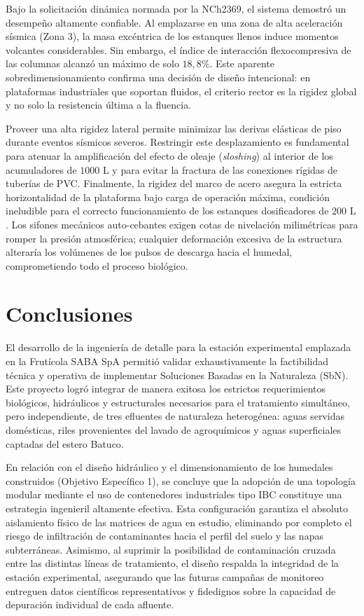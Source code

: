 \documentclass[12pt, letterpaper]{report}
\begin{document}
Bajo la solicitación dinámica normada por la NCh2369, el sistema demostró un desempeño altamente confiable. Al emplazarse en una zona de alta aceleración sísmica (Zona 3), la masa excéntrica de los estanques llenos induce momentos volcantes considerables. Sin embargo, el índice de interacción flexocompresiva de las columnas alcanzó un máximo de solo $18,8\%$. Este aparente sobredimensionamiento confirma una decisión de diseño intencional: en plataformas industriales que soportan fluidos, el criterio rector es la rigidez global y no solo la resistencia última a la fluencia. 

Proveer una alta rigidez lateral permite minimizar las derivas elásticas de piso durante eventos sísmicos severos. Restringir este desplazamiento es fundamental para atenuar la amplificación del efecto de oleaje (\textit{sloshing}) al interior de los acumuladores de $1000\text{ L}$ y para evitar la fractura de las conexiones rígidas de tuberías de PVC. Finalmente, la rigidez del marco de acero asegura la estricta horizontalidad de la plataforma bajo carga de operación máxima, condición ineludible para el correcto funcionamiento de los estanques dosificadores de $200\text{ L}$. Los sifones mecánicos auto-cebantes exigen cotas de nivelación milimétricas para romper la presión atmosférica; cualquier deformación excesiva de la estructura alteraría los volúmenes de los pulsos de descarga hacia el humedal, comprometiendo todo el proceso biológico.


\chapter{Conclusiones}

El desarrollo de la ingeniería de detalle para la estación experimental emplazada en la Frutícola SABA SpA permitió validar exhaustivamente la factibilidad técnica y operativa de implementar Soluciones Basadas en la Naturaleza (SbN). Este proyecto logró integrar de manera exitosa los estrictos requerimientos biológicos, hidráulicos y estructurales necesarios para el tratamiento simultáneo, pero independiente, de tres efluentes de naturaleza heterogénea: aguas servidas domésticas, riles provenientes del lavado de agroquímicos y aguas superficiales captadas del estero Batuco.

En relación con el diseño hidráulico y el dimensionamiento de los humedales construidos (Objetivo Específico 1), se concluye que la adopción de una topología modular mediante el uso de contenedores industriales tipo IBC constituye una estrategia ingenieril altamente efectiva. Esta configuración garantiza el absoluto aislamiento físico de las matrices de agua en estudio, eliminando por completo el riesgo de infiltración de contaminantes hacia el perfil del suelo y las napas subterráneas. Asimismo, al suprimir la posibilidad de contaminación cruzada entre las distintas líneas de tratamiento, el diseño respalda la integridad de la estación experimental, asegurando que las futuras campañas de monitoreo entreguen datos científicos representativos y fidedignos sobre la capacidad de depuración individual de cada afluente.
\end{document}
